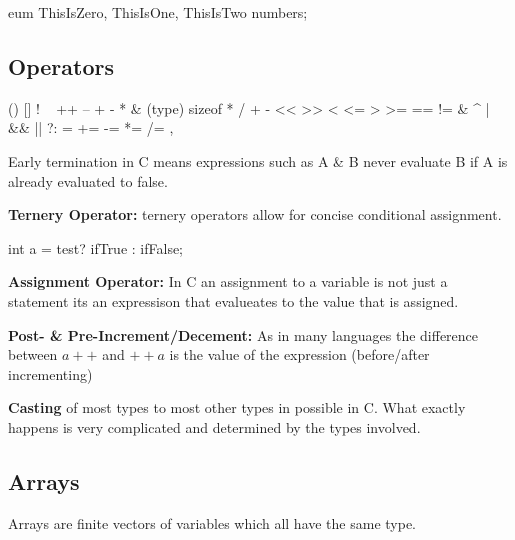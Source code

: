 \begin{codeexample}
eum { ThisIsZero, ThisIsOne, ThisIsTwo} numbers;
\end{codeexample}

\subsection{Operators}

\begin{codeexample}
() []
! ~ ++ -- + - * & (type) sizeof
* / %
+ -
<< >>
< <= > >=
== !=
&
^
|
&&
||
?:
= += -= *= /= %
,
\end{codeexample}

\begin{remark}
    Early termination in C means expressions such as A \& B never evaluate B if A is already evaluated to false.
\end{remark}

\begin{definition}
    \textbf{Ternery Operator:} ternery operators allow for concise conditional assignment.
\end{definition}

\begin{codeexample}
int a = {test}? ifTrue : ifFalse;
\end{codeexample}

\begin{definition}
    \textbf{Assignment Operator:} In C an assignment to a variable is not just a statement its an expressison that evalueates to the value that is assigned.
\end{definition}

\begin{definition}
    \textbf{Post- \& Pre-Increment/Decement:} As in many languages the difference between $a++$ and $++a$ is the value of the expression (before/after incrementing)
\end{definition}

\begin{important}
    \textbf{Casting} of most types to most other types in possible in C. What exactly happens is very complicated and determined by the types involved.
\end{important}

\subsection{Arrays}

\begin{definition}
    Arrays are finite vectors of variables which all have the same type.
\end{definition}

